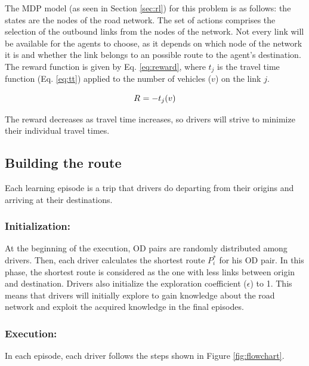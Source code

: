 \documentclass{RITA}
\newcommand{\travTime}{\ensuremath{t_j}} 	%
\newcommand{\veh}{\ensuremath{v}}		%
\newcommand{\reward}[1][]{\ensuremath{R_#1}}	%
\begin{document}
The MDP model (as seen in Section \ref{sec:rl}) for this problem is as follows: the states are the nodes of the road network. The set of actions comprises the selection of the outbound links from the nodes of the network. Not every link will be available for the agents to choose, as it depends on which node of the network it is and whether the link belongs to an possible route to the agent's destination. The reward function is given by Eq. \eqref{eq:reward}, where $\travTime$ is the travel time function (Eq. \eqref{eq:tt}) applied to the number of vehicles ($\veh$) on the link $j$.

\begin{equation}
\label{eq:reward}
\reward{} = - \travTime(\veh)
\end{equation}

The reward decreases as travel time increases, so drivers will strive to minimize their individual travel times.

\subsection{Building the route}

Each learning episode is a trip that drivers do departing from their origins and arriving at their destinations.

\subsubsection{Initialization:}
At the beginning of the execution, OD pairs are randomly distributed among drivers. Then, each driver calculates the shortest route $P_i^*$ for his OD pair. In this phase, the shortest route is considered as the one with less links between origin and destination. Drivers also initialize the exploration coefficient ($\epsilon$) to 1. This means that drivers will initially explore to gain knowledge about the road network and exploit the acquired knowledge in the final episodes.

\subsubsection{Execution:}

In each episode, each driver follows the steps shown in Figure \ref{fig:flowchart}.
\end{document}
